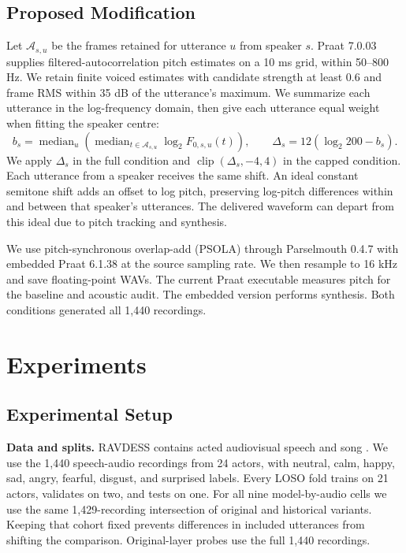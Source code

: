 \documentclass[11pt, letterpaper]{article}
\begin{document}
\subsection{Proposed Modification}
Let $\mathcal A_{s,u}$ be the frames retained for utterance $u$ from speaker $s$. Praat 7.0.03 supplies filtered-autocorrelation pitch estimates on a 10 ms grid, within 50--800 Hz. We retain finite voiced estimates with candidate strength at least 0.6 and frame RMS within 35 dB of the utterance's maximum. We summarize each utterance in the log-frequency domain, then give each utterance equal weight when fitting the speaker centre:
\[
  b_s=\operatorname{median}_{u}
       \left(\operatorname{median}_{t\in\mathcal A_{s,u}}\log_2 F_{0,s,u}(t)\right),
  \qquad \Delta_s=12(\log_2 200-b_s).
\]
We apply $\Delta_s$ in the full condition and $\operatorname{clip}(\Delta_s,-4,4)$ in the capped condition. Each utterance from a speaker receives the same shift. An ideal constant semitone shift adds an offset to log pitch, preserving log-pitch differences within and between that speaker's utterances. The delivered waveform can depart from this ideal due to pitch tracking and synthesis.

We use pitch-synchronous overlap-add (PSOLA) through Parselmouth 0.4.7 with embedded Praat 6.1.38 at the source sampling rate. We then resample to 16 kHz and save floating-point WAVs. The current Praat executable measures pitch for the baseline and acoustic audit. The embedded version performs synthesis. Both conditions generated all 1,440 recordings.

\section{Experiments}
\subsection{Experimental Setup}
\textbf{Data and splits.} RAVDESS contains acted audiovisual speech and song \cite{ravdess}. We use the 1,440 speech-audio recordings from 24 actors, with neutral, calm, happy, sad, angry, fearful, disgust, and surprised labels. Every LOSO fold trains on 21 actors, validates on two, and tests on one. For all nine model-by-audio cells we use the same 1,429-recording intersection of original and historical variants. Keeping that cohort fixed prevents differences in included utterances from shifting the comparison. Original-layer probes use the full 1,440 recordings.
\end{document}
